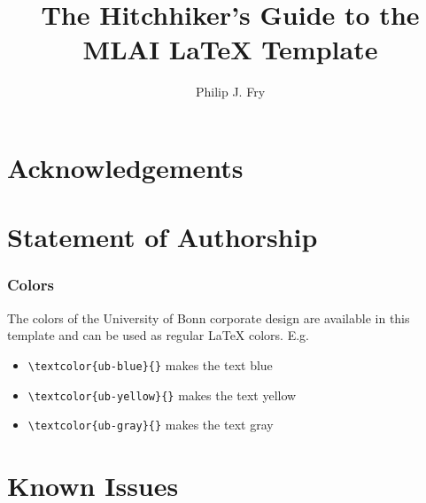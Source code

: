 \documentclass[ba,logo]{mlai-thesis}
\title{The Hitchhiker's Guide to the MLAI \LaTeX{} Template}
\author{Philip J. Fry\\\birthinfo{August 14, 1974 in Brooklyn, New York}}
\begin{document}
	
	\frontmatter 
	
	\maketitle 
	
	\cleardoublepage
	\begin{abstract}
		\blindtext[3]
	\end{abstract}

	\chapter*{Acknowledgements}  
	
	\cleardoublepage
	\chapter*{Statement of Authorship} 
	 
	
	\cleardoublepage
	\tableofcontents
	
	
	\mainmatter
	
	 
	
	
	
	 
	
	

	\subsection{Colors}
	The colors of the University of Bonn corporate design are available in this template and can be used as regular \LaTeX{} colors. E.g.
	\begin{itemize}
	\item \verb+\textcolor{ub-blue}{}+ \textcolor{ub-blue}{makes the text blue}
	\item \verb+\textcolor{ub-yellow}{}+ \textcolor{ub-yellow}{makes the text yellow}
	\item \verb+\textcolor{ub-gray}{}+ \textcolor{ub-gray}{makes the text gray}
	\end{itemize}
	
	 
	
	 
	
	\backmatter
	
	\printbibliography[heading=bibintoc]
	
	\listoffigures
	
	\listoftables
	
	\appendix
	
	\chapter{Known Issues}  
	
\end{document}
